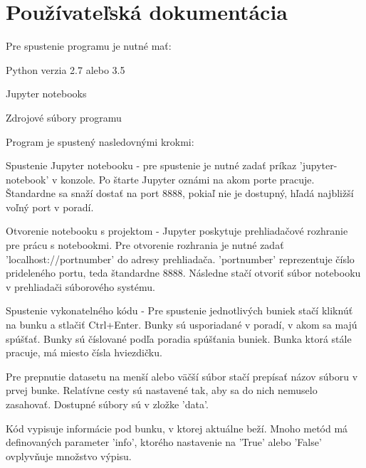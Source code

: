 
\chapter{Používateľská dokumentácia}

Pre spustenie programu je nutné mať:

\begin{my_itemize}
	\item{Python verzia 2.7 alebo 3.5}
	\item{Jupyter notebooks}
	\item{Zdrojové súbory programu}
\end{my_itemize}

Program je spustený nasledovnými krokmi:
\begin{my_enumerate}
	\item{Spustenie Jupyter notebooku} - pre spustenie je nutné zadať príkaz 'jupyter-notebook' v konzole. Po štarte Jupyter oznámi na akom porte pracuje. Štandardne sa snaží dostať na port 8888, pokiaľ nie je dostupný, hľadá najbližší voľný port v poradí.
	\item{Otvorenie notebooku s projektom} - Jupyter poskytuje prehliadačové rozhranie pre prácu s notebookmi. Pre otvorenie rozhrania je nutné zadať 'localhost://portnumber' do adresy prehliadača. 'portnumber' reprezentuje číslo prideleného portu, teda štandardne 8888. Následne stačí otvoriť súbor notebooku v prehliadači súborového systému.
	\item{Spustenie vykonatelného kódu} - Pre spustenie jednotlivých buniek stačí kliknúť na bunku a stlačiť Ctrl+Enter. Bunky sú usporiadané v poradí, v akom sa majú spúšťať. Bunky sú číslované podľa poradia spúšťania buniek. Bunka ktorá stále pracuje, má miesto čísla hviezdičku.
	
	Pre prepnutie datasetu na menší alebo väčší súbor stačí prepísať názov súboru v prvej bunke. Relatívne cesty sú nastavené tak, aby sa do nich nemuselo zasahovať. Dostupné súbory sú v zložke 'data'.
	
	Kód vypisuje informácie pod bunku, v ktorej aktuálne beží. Mnoho metód má definovaných parameter 'info', ktorého nastavenie na 'True' alebo 'False'  ovplyvňuje množstvo výpisu.
\end{my_enumerate}
